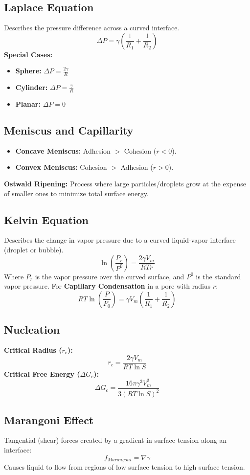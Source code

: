 \subsection{Laplace Equation}
Describes the pressure difference across a curved interface.
\begin{equation}
    \Delta P = \gamma \left( \frac{1}{R_1} + \frac{1}{R_2} \right)
\end{equation}
\textbf{Special Cases:}
\begin{itemize}
    \item \textbf{Sphere:} $\Delta P = \frac{2\gamma}{R}$
    \item \textbf{Cylinder:} $\Delta P = \frac{\gamma}{R}$
    \item \textbf{Planar:} $\Delta P = 0$
\end{itemize}

\subsection{Meniscus and Capillarity}
\begin{itemize}
    \item \textbf{Concave Meniscus:} Adhesion $>$ Cohesion ($r < 0$).
    \item \textbf{Convex Meniscus:} Cohesion $>$ Adhesion ($r > 0$).
\end{itemize}
\textbf{Ostwald Ripening:} Process where large particles/droplets grow at the expense of smaller ones to minimize total surface energy.

\subsection{Kelvin Equation}
Describes the change in vapor pressure due to a curved liquid-vapor interface (droplet or bubble).
\begin{equation}
    \ln \left( \frac{P_r}{P^0} \right) = \frac{2 \gamma V_m}{RT r}
\end{equation}
Where $P_r$ is the vapor pressure over the curved surface, and $P^0$ is the standard vapor pressure.
For \textbf{Capillary Condensation} in a pore with radius $r$:
\begin{equation}
    RT \ln \left( \frac{P}{P_0} \right) = \gamma V_m \left( \frac{1}{R_1} + \frac{1}{R_2} \right)
\end{equation}

\subsection{Nucleation}
\textbf{Critical Radius ($r_c$):}
\begin{equation}
    r_c = \frac{2 \gamma V_m}{RT \ln S}
\end{equation}
\textbf{Critical Free Energy ($\Delta G_c$):}
\begin{equation}
    \Delta G_c = \frac{16 \pi \gamma^3 V_m^2}{3 (RT \ln S)^2}
\end{equation}

\subsection{Marangoni Effect}
Tangential (shear) forces created by a gradient in surface tension along an interface:
\begin{equation}
    f_{Marangoni} = \nabla \gamma
\end{equation}
Causes liquid to flow from regions of low surface tension to high surface tension.
\vspace{0.2cm}
